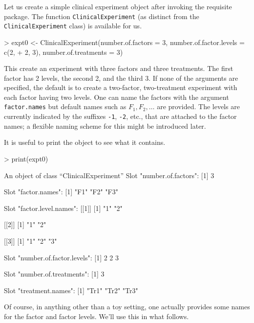 \documentclass[11pt, letter]{article}
\numberwithin{equation}{section}
\begin{document}
Let us create a simple clinical experiment object after invoking the
requisite package. The function \texttt{ClinicalExperiment} (as
distinct from the \texttt{ClinicalExperiment} class) is available for
us. 

\begin{Schunk}
\begin{Sinput}
> expt0 <- ClinicalExperiment(number.of.factors = 3, number.of.factor.levels = c(2, 
+     2, 3), number.of.treatments = 3)
\end{Sinput}
\end{Schunk}

This create an experiment with three factors and three treatments. The
first factor has 2 levels, the second 2, and the third 3. If none of
the arguments are specified, the default is to create a two-factor,
two-treatment experiment with each factor having two levels. One can
name the factors with the argument \texttt{factor.names} but default
names such as $F_1, F_2,\ldots$ are provided. The levels are currently
indicated by the suffixes \texttt{-1}, \texttt{-2}, etc., that are
attached to the factor names; a flexible naming scheme for this might
be introduced later.

It is useful to print the object to see what it contains.
\begin{Schunk}
\begin{Sinput}
> print(expt0)
\end{Sinput}
\begin{Soutput}
An object of class “ClinicalExperiment”
Slot "number.of.factors":
[1] 3

Slot "factor.names":
[1] "F1" "F2" "F3"

Slot "factor.level.names":
[[1]]
[1] "1" "2"

[[2]]
[1] "1" "2"

[[3]]
[1] "1" "2" "3"


Slot "number.of.factor.levels":
[1] 2 2 3

Slot "number.of.treatments":
[1] 3

Slot "treatment.names":
[1] "Tr1" "Tr2" "Tr3"
\end{Soutput}
\end{Schunk}

Of course, in anything other than a toy setting, one actually provides
some names for the factor and factor levels. We'll use this in what
follows. 
\end{document}
